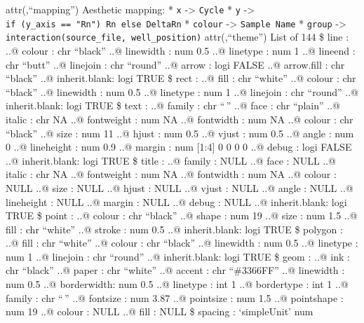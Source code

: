 \documentclass[
]{article}
\begin{document}
attr(,``mapping'') Aesthetic mapping: * \texttt{x} -\textgreater{}
\texttt{Cycle} * \texttt{y} -\textgreater{}
\texttt{if\ (y\_axis\ ==\ "Rn")\ Rn\ else\ DeltaRn} * \texttt{colour}
-\textgreater{} \texttt{Sample\ Name} * \texttt{group} -\textgreater{}
\texttt{interaction(source\_file,\ well\_position)} attr(,``theme'')
List of 144 \$ line : ..@ colour : chr ``black'' ..@ linewidth : num 0.5
..@ linetype : num 1 ..@ lineend : chr ``butt'' ..@ linejoin : chr
``round'' ..@ arrow : logi FALSE ..@ arrow.fill : chr ``black'' ..@
inherit.blank: logi TRUE \$ rect : ..@ fill : chr ``white'' ..@ colour :
chr ``black'' ..@ linewidth : num 0.5 ..@ linetype : num 1 ..@ linejoin
: chr ``round'' ..@ inherit.blank: logi TRUE \$ text : ..@ family : chr
``\,'' ..@ face : chr ``plain'' ..@ italic : chr NA ..@ fontweight : num
NA ..@ fontwidth : num NA ..@ colour : chr ``black'' ..@ size : num 11
..@ hjust : num 0.5 ..@ vjust : num 0.5 ..@ angle : num 0 ..@ lineheight
: num 0.9 ..@ margin : num {[}1:4{]} 0 0 0 0 ..@ debug : logi FALSE ..@
inherit.blank: logi TRUE \$ title : ..@ family : NULL ..@ face : NULL
..@ italic : chr NA ..@ fontweight : num NA ..@ fontwidth : num NA ..@
colour : NULL ..@ size : NULL ..@ hjust : NULL ..@ vjust : NULL ..@
angle : NULL ..@ lineheight : NULL ..@ margin : NULL ..@ debug : NULL
..@ inherit.blank: logi TRUE \$ point : ..@ colour : chr ``black'' ..@
shape : num 19 ..@ size : num 1.5 ..@ fill : chr ``white'' ..@ stroke :
num 0.5 ..@ inherit.blank: logi TRUE \$ polygon : ..@ fill : chr
``white'' ..@ colour : chr ``black'' ..@ linewidth : num 0.5 ..@
linetype : num 1 ..@ linejoin : chr ``round'' ..@ inherit.blank: logi
TRUE \$ geom : ..@ ink : chr ``black'' ..@ paper : chr ``white'' ..@
accent : chr ``\#3366FF'' ..@ linewidth : num 0.5 ..@ borderwidth: num
0.5 ..@ linetype : int 1 ..@ bordertype : int 1 ..@ family : chr ``\,''
..@ fontsize : num 3.87 ..@ pointsize : num 1.5 ..@ pointshape : num 19
..@ colour : NULL ..@ fill : NULL \$ spacing : `simpleUnit' num
\end{document}
